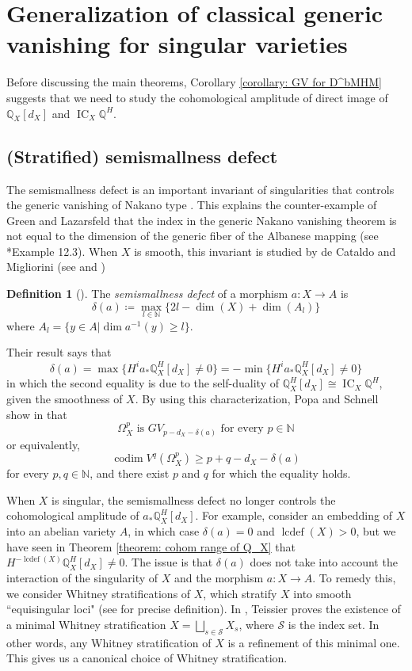 \documentclass[11pt]{amsart}
\theoremstyle{definition}
\newtheorem{definition}[equation]{Definition}
\theoremstyle{plain}
\newcommand{\NN}{\mathbb N}
\newcommand{\QQ}{\mathbb Q}
\newcommand{\sS}{\mathscr S}
\DeclareMathOperator{\codim}{codim}
\DeclareMathOperator{\IC}{IC}
\DeclareMathOperator{\lcdef}{lcdef}
\newcommand{\quotes}[1]{``#1"}
\begin{document}
\section{Generalization of classical generic vanishing for singular varieties}

Before discussing the main theorems, Corollary \ref{corollary: GV for D^bMHM} suggests that we need to study the cohomological amplitude of direct image of $\QQ_X[d_X]$ and $\IC_X\QQ^H$. 

\subsection{(Stratified) semismallness defect}

The semismallness defect is an important invariant of singularities that controls the generic vanishing of Nakano type \cite{PS_generic_vanishing}. This explains the counter-example of Green and Lazarsfeld that the index in the generic Nakano vanishing theorem is not equal to the dimension of the generic fiber of the Albanese mapping (see \cite{PS_generic_vanishing}*{Example 12.3}). When $X$ is smooth, this invariant is studied by de Cataldo and Migliorini (see \cite[Remark 2.1.2]{CM-semismalldefect} and \cite[Proposition 11.2]{PS_generic_vanishing})

\begin{definition} [{\cite[Definition 4.7.2]{CM-semismalldefect}}] \label{definition: semismall-defect}
    The \textit{semismallness defect} of a morphism $a:X\to A$ is 
    \[\delta(a) \coloneqq \max_{l\in \NN} \{2l-\dim(X) + \dim(A_l)\}\]
    where $A_l = \{y\in A | \dim a^{-1}(y)\ge l \}$.
\end{definition}

Their result says that 
\[\delta(a) = \max \{H^i a_* \QQ^H_X[d_X] \neq 0\} = -\min \{H^i a_* \QQ^H_X[d_X] \neq 0\}\] in which the second equality is due to the self-duality of $\QQ^H_X[d_X] \cong \IC_X\QQ^H$, given the smoothness of $X$. By using this characterization, Popa and Schnell show in \cite[Theorem 3.2]{PS_generic_vanishing} that 
\[\Omega^p_X \text{ is } GV_{p-d_X-\delta(a)} \text{ for every } p\in \NN\]
or equivalently, 
\[\codim V^q(\Omega^p_X) \ge p+q-d_X -\delta(a)\] 
for every $p,q\in \NN$, and there exist $p$ and $q$ for which the equality holds.  

When $X$ is singular, the semismallness defect no longer controls the cohomological amplitude of $a_* \QQ^H_X[d_X]$. For example, consider an embedding of $X$ into an abelian variety $A$, in which case $\delta(a) = 0$ and $\lcdef(X) > 0$, but we have seen in Theorem \ref{theorem: cohom range of Q_X} that $H^{-\lcdef(X)} \QQ^H_X[d_X] \neq 0$. The issue is that $\delta(a)$ does not take into account the interaction of the singularity of $X$ and the morphism $a:X \to A$. To remedy this, we consider Whitney stratifications of $X$, which stratify $X$ into smooth \quotes{equisingular loci} (see \cite[Definition E.3.7]{HTT} for precise definition). In \cite{min-whitney-strata}, Teissier proves the existence of a minimal Whitney stratification $X = \bigsqcup_{s\in \sS} X_s$, where $\sS$ is the index set. In other words, any Whitney stratification of $X$ is a refinement of this minimal one. This gives us a canonical choice of Whitney stratification. 
\end{document}
